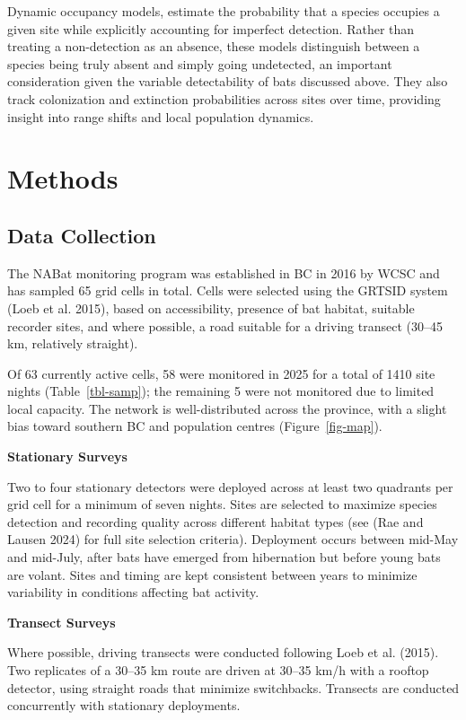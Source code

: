 \documentclass[
  letterpaper,
  DIV=11,
  numbers=noendperiod]{scrartcl}
\begin{document}
Dynamic occupancy models, estimate the probability that a species
occupies a given site while explicitly accounting for imperfect
detection. Rather than treating a non-detection as an absence, these
models distinguish between a species being truly absent and simply going
undetected, an important consideration given the variable detectability
of bats discussed above. They also track colonization and extinction
probabilities across sites over time, providing insight into range
shifts and local population dynamics.

\section{Methods}\label{methods}

\subsection{Data Collection}\label{data-collection}

The NABat monitoring program was established in BC in 2016 by WCSC and
has sampled 65 grid cells in total. Cells were selected using the GRTSID
system (Loeb et al. 2015), based on accessibility, presence of bat
habitat, suitable recorder sites, and where possible, a road suitable
for a driving transect (30--45 km, relatively straight).

Of 63 currently active cells, 58 were monitored in 2025 for a total of
1410 site nights (Table~\ref{tbl-samp}); the remaining 5 were not
monitored due to limited local capacity. The network is well-distributed
across the province, with a slight bias toward southern BC and
population centres (Figure~\ref{fig-map}).

\textbf{Stationary Surveys}

Two to four stationary detectors were deployed across at least two
quadrants per grid cell for a minimum of seven nights. Sites are
selected to maximize species detection and recording quality across
different habitat types (see (Rae and Lausen 2024) for full site
selection criteria). Deployment occurs between mid-May and mid-July,
after bats have emerged from hibernation but before young bats are
volant. Sites and timing are kept consistent between years to minimize
variability in conditions affecting bat activity.

\textbf{Transect Surveys}

Where possible, driving transects were conducted following Loeb et al.
(2015). Two replicates of a 30--35 km route are driven at 30--35 km/h
with a rooftop detector, using straight roads that minimize switchbacks.
Transects are conducted concurrently with stationary deployments.
\end{document}
